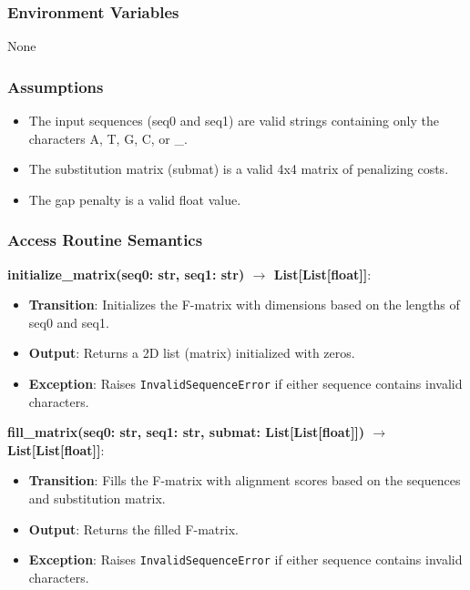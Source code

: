 \documentclass[12pt, titlepage]{article}
\begin{document}
\subsubsection{Environment Variables}

None

\subsubsection{Assumptions}

\begin{itemize}
    \item The input sequences (seq0 and seq1) are valid strings containing only the characters A, T, G, C, or \_.
    \item The substitution matrix (submat) is a valid 4x4 matrix of penalizing costs.
    \item The gap penalty is a valid float value.
\end{itemize}

\subsubsection{Access Routine Semantics}

\noindent \textbf{initialize\_matrix(seq0: str, seq1: str) $\rightarrow$ List[List[float]]}:
\begin{itemize}
    \item \textbf{Transition}: Initializes the F-matrix with dimensions based on the lengths of seq0 and seq1.
    \item \textbf{Output}: Returns a 2D list (matrix) initialized with zeros.
    \item \textbf{Exception}: Raises \texttt{InvalidSequenceError} if either sequence contains invalid characters.
\end{itemize}

\noindent \textbf{fill\_matrix(seq0: str, seq1: str, submat: List[List[float]]) $\rightarrow$ List[List[float]]}:
\begin{itemize}
    \item \textbf{Transition}: Fills the F-matrix with alignment scores based on the sequences and substitution matrix.
    \item \textbf{Output}: Returns the filled F-matrix.
    \item \textbf{Exception}: Raises \texttt{InvalidSequenceError} if either sequence contains invalid characters.
\end{itemize}
\end{document}
